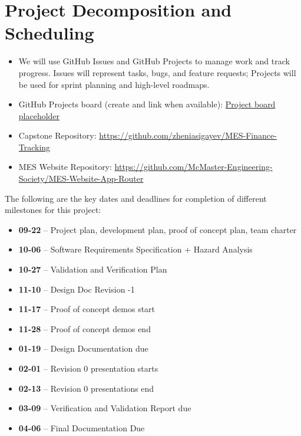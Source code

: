 \documentclass{article}
\begin{document}
\section{Project Decomposition and Scheduling}

\begin{itemize}
  \item We will use GitHub Issues and GitHub Projects to manage work and track progress. Issues will represent tasks, bugs, and feature requests; Projects will be used for sprint planning and high-level roadmaps.
  \item GitHub Projects board (create and link when available): \href{https://github.com/zheniasigayev/MES-Finance-Tracking/projects}{Project board placeholder}
  \item Capstone Repository: \href{https://github.com/zheniasigayev/MES-Finance-Tracking}{https://github.com/zheniasigayev/MES-Finance-Tracking}
  \item MES Website Repository: \href{https://github.com/McMaster-Engineering-Society/MES-Website-App-Router}{https://github.com/McMaster-Engineering-Society/MES-Website-App-Router}
\end{itemize}

The following are the key dates and deadlines for completion of different milestones for this project:

\begin{itemize}
    \item \textbf{09-22} -- Project plan, development plan, proof of concept plan, team charter
    \item \textbf{10-06} -- Software Requirements Specification + Hazard Analysis
    \item \textbf{10-27} -- Validation and Verification Plan
    \item \textbf{11-10} -- Design Doc Revision -1
    \item \textbf{11-17} -- Proof of concept demos start
    \item \textbf{11-28} -- Proof of concept demos end
    \item \textbf{01-19} -- Design Documentation due
    \item \textbf{02-01} -- Revision 0 presentation starts
    \item \textbf{02-13} -- Revision 0 presentations end
    \item \textbf{03-09} -- Verification and Validation Report due
    \item \textbf{04-06} -- Final Documentation Due
\end{itemize}
\end{document}
